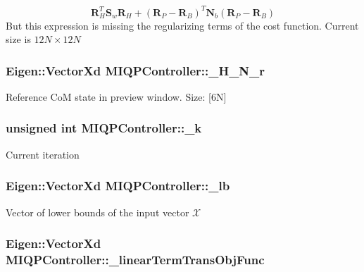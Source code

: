 \[ \mathbf{R}_H^T \mathbf{S}_w \mathbf{R}_H + (\mathbf{R}_P - \mathbf{R}_B)^T \mathbf{N}_b (\mathbf{R}_P - \mathbf{R}_B) \] \-But this expression is missing the regularizing terms of the cost function. \-Current size is $12N\times12N$ \hypertarget{classMIQPController_a03c53b7f316d43dfe1aa60eba628819c}{
\subsubsection[{\-\_\-\-H\-\_\-\-N\-\_\-r}]{\setlength{\rightskip}{0pt plus 5cm}\-Eigen\-::\-Vector\-Xd {\bf \-M\-I\-Q\-P\-Controller\-::\-\_\-\-H\-\_\-\-N\-\_\-r}}}\label{classMIQPController_a03c53b7f316d43dfe1aa60eba628819c}
\-Reference \-Co\-M state in preview window. \-Size\-: \mbox{[}6\-N\mbox{]} \hypertarget{classMIQPController_af60e2d5a786f4af4fa445dea6ba1b625}{
\subsubsection[{\-\_\-k}]{\setlength{\rightskip}{0pt plus 5cm}unsigned int {\bf \-M\-I\-Q\-P\-Controller\-::\-\_\-k}}}\label{classMIQPController_af60e2d5a786f4af4fa445dea6ba1b625}
\-Current iteration \hypertarget{classMIQPController_ad3544c00f3515146c1818440905e36cc}{
\subsubsection[{\-\_\-lb}]{\setlength{\rightskip}{0pt plus 5cm}\-Eigen\-::\-Vector\-Xd {\bf \-M\-I\-Q\-P\-Controller\-::\-\_\-lb}}}\label{classMIQPController_ad3544c00f3515146c1818440905e36cc}
\-Vector of lower bounds of the input vector $\mathcal{X}$ \hypertarget{classMIQPController_ac2ec0c5287589fe28f7381ebeaa5f4ef}{
\subsubsection[{\-\_\-linear\-Term\-Trans\-Obj\-Func}]{\setlength{\rightskip}{0pt plus 5cm}\-Eigen\-::\-Vector\-Xd {\bf \-M\-I\-Q\-P\-Controller\-::\-\_\-linear\-Term\-Trans\-Obj\-Func}}}\label{classMIQPController_ac2ec0c5287589fe28f7381ebeaa5f4ef}
